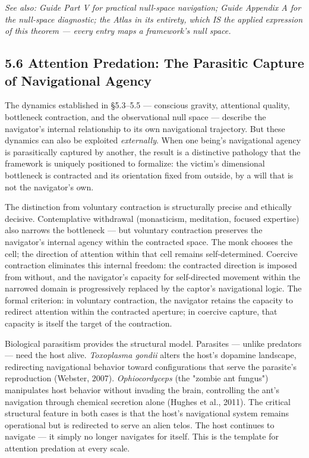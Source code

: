 \textit{See also: Guide Part V for practical null-space navigation; Guide Appendix A for the null-space diagnostic; the Atlas in its entirety, which IS the applied expression of this theorem — every entry maps a framework's null space.}


\subsection*{5.6 Attention Predation: The Parasitic Capture of Navigational Agency}


The dynamics established in §5.3–5.5 — conscious gravity, attentional quality, bottleneck contraction, and the observational null space — describe the navigator's internal relationship to its own navigational trajectory. But these dynamics can also be exploited \textit{externally}. When one being's navigational agency is parasitically captured by another, the result is a distinctive pathology that the framework is uniquely positioned to formalize: the victim's dimensional bottleneck is contracted and its orientation fixed from outside, by a will that is not the navigator's own.


The distinction from voluntary contraction is structurally precise and ethically decisive. Contemplative withdrawal (monasticism, meditation, focused expertise) also narrows the bottleneck — but voluntary contraction preserves the navigator's internal agency within the contracted space. The monk chooses the cell; the direction of attention within that cell remains self-determined. Coercive contraction eliminates this internal freedom: the contracted direction is imposed from without, and the navigator's capacity for self-directed movement within the narrowed domain is progressively replaced by the captor's navigational logic. The formal criterion: in voluntary contraction, the navigator retains the capacity to redirect attention within the contracted aperture; in coercive capture, that capacity is itself the target of the contraction.


Biological parasitism provides the structural model. Parasites — unlike predators — need the host alive. \textit{Toxoplasma gondii} alters the host's dopamine landscape, redirecting navigational behavior toward configurations that serve the parasite's reproduction (Webster, 2007). \textit{Ophiocordyceps} (the "zombie ant fungus") manipulates host behavior without invading the brain, controlling the ant's navigation through chemical secretion alone (Hughes et al., 2011). The critical structural feature in both cases is that the host's navigational system remains operational but is redirected to serve an alien telos. The host continues to navigate — it simply no longer navigates for itself. This is the template for attention predation at every scale.


